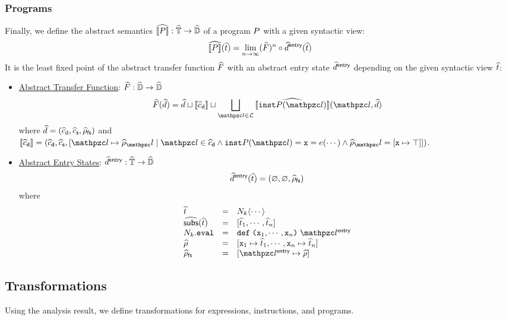 \documentclass[10pt,conference]{IEEEtran}
\begin{document}
\subsubsection{Programs} Finally, we define the abstract semantics $\widehat{\llbracket{P}\rrbracket}:
\widehat{\mathbb{T}} \rightarrow \widehat{\mathbb{D}}$ of a program $P$ with a given syntactic
view:
\[
  \widehat{\llbracket{P}\rrbracket}(\widehat{t}) = \lim_{n \rightarrow \infty}(\widehat{F})^n \circ
  \widehat{d}^{\textsf{entry}}(\widehat{t})
\]
It is the least fixed point of the abstract transfer function $\widehat{F}$ with
an abstract entry state $\widehat{d}^{\textsf{entry}}$ depending on the given syntactic view
$\widehat{t}$:
\begin{itemize}
  \item \underline{Abstract Transfer Function}: $\widehat{F}: \widehat{\mathbb{D}}
    \rightarrow \widehat{\mathbb{D}}$
    \[
      \atransfer(\aelem) = \aelem \join \sem{\adcall} \join
      \bigjoin_{\lab \in \labset}{\asem{\getinst{\prog}(\lab)}(\lab, \aelem)}
    \]
    where $\widehat{d} = (\widehat{c}_{\textsf{d}}, \widehat{c}_{\textsf{s}}, \widehat{\rho}_{\textsf{fs}})$ and $\sem{\adcall} = (\adcall,
    \ascall, [\lab \mapsto \aenv_\lab \mid \lab \in \adcall \wedge
    \getinst{\prog}(\lab) = \varx = \expr(\cdots) \wedge \aenv_\lab = [\varx
    \mapsto \top]])$.
  \item \underline{Abstract Entry States}: $\widehat{d}^{\textsf{entry}}:
    \widehat{\mathbb{T}} \rightarrow \widehat{\mathbb{D}}$
    \[
      \widehat{d}^{\textsf{entry}}(\widehat{t}) = (\varnothing, \varnothing, \widehat{\rho}_{\textsf{fs}})
    \]
    where \[
      \begin{array}{lcl}
        \atree &=& \nt_k \langle \cdots \rangle\\

        \agetsubs(\atree) &=& [\atree_1, \cdots, \atree_n]\\

        \nt_k.\eval &=& \kwdef \; \kwrl \varx_1, \cdots, \varx_n \kwrr
        \; \entrylab\\

        \aenv &=& [\varx_1 \mapsto \atree_1, \cdots, \varx_n \mapsto
        \atree_n]\\

        \afsenv &=& [\entrylab \mapsto \aenv]\\
      \end{array}
    \]
\end{itemize}


\subsection{Transformations}

Using the analysis result, we define transformations for expressions,
instructions, and programs.
\end{document}
